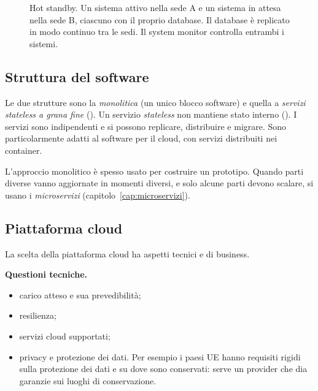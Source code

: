 \begin{figure}[ht]
\centering
{}
\caption{Hot standby. Un sistema attivo nella sede A e un sistema in attesa nella sede B, ciascuno con il proprio
database. Il database è replicato in modo continuo tra le sedi. Il system monitor controlla entrambi i sistemi.}
\label{fig:cloud-hotstandby}
\end{figure}

\subsection{Struttura del software}
\label{sec:cloud-struttura}

Le due strutture sono la \emph{monolitica} (un unico blocco software) e quella a \emph{servizi stateless a grana
fine} (). Un servizio \emph{stateless} non mantiene stato interno ().
I servizi sono indipendenti e si possono replicare, distribuire e migrare. Sono particolarmente adatti al software per il cloud, con servizi
distribuiti nei container.

L'approccio monolitico è spesso usato per costruire un prototipo. Quando parti diverse vanno aggiornate in momenti
diversi, e solo alcune parti devono scalare, si usano i \emph{microservizi} (capitolo~\ref{cap:microservizi}).

\subsection{Piattaforma cloud}
\label{sec:cloud-piattaforma}

La scelta della piattaforma cloud ha aspetti tecnici e di business.

\textbf{Questioni tecniche.}
\begin{itemize}
  \item carico atteso e sua prevedibilità;
  \item resilienza;
  \item servizi cloud supportati;
  \item privacy e protezione dei dati. Per esempio i paesi UE hanno requisiti rigidi sulla protezione dei dati e
    su dove sono conservati: serve un provider che dia garanzie sui luoghi di conservazione.
\end{itemize}

